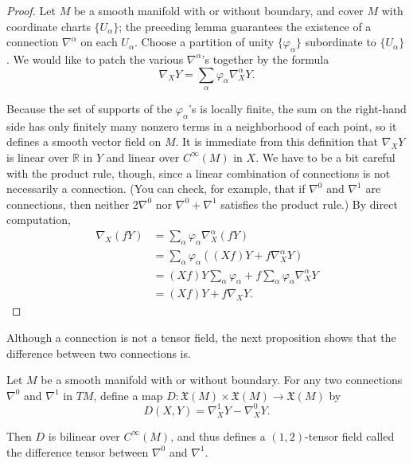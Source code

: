 \begin{proof}
Let $M$ be a smooth manifold with or without boundary, and cover $M$ with coordinate charts $\{U_\alpha\}$; the preceding lemma guarantees the existence of a connection $\nabla^\alpha$ on each $U_\alpha$. Choose a partition of unity $\{\varphi_\alpha\}$ subordinate to $\{U_\alpha\}$. We would like to patch the various $\nabla^\alpha$'s together by the formula
\begin{equation}
\nabla_X Y = \sum_\alpha \varphi_\alpha \nabla_X^\alpha Y. \tag{4.11}
\end{equation}

Because the set of supports of the $\varphi_\alpha$'s is locally finite, the sum on the right-hand side has only finitely many nonzero terms in a neighborhood of each point, so it defines a smooth vector field on $M$. It is immediate from this definition that $\nabla_X Y$ is linear over $\mathbb{R}$ in $Y$ and linear over $C^\infty(M)$ in $X$. We have to be a bit careful with the product rule, though, since a linear combination of connections is not necessarily a connection. (You can check, for example, that if $\nabla^0$ and $\nabla^1$ are connections, then neither $2\nabla^0$ nor $\nabla^0 + \nabla^1$ satisfies the product rule.) By direct computation,
\begin{align*}
\nabla_X(fY) &= \sum_\alpha \varphi_\alpha \nabla_X^\alpha(fY) \\
&= \sum_\alpha \varphi_\alpha((Xf)Y + f\nabla_X^\alpha Y) \\
&= (Xf)Y \sum_\alpha \varphi_\alpha + f\sum_\alpha \varphi_\alpha \nabla_X^\alpha Y \\
&= (Xf)Y + f\nabla_X Y.
\end{align*}
\end{proof}

Although a connection is not a tensor field, the next proposition shows that the difference between two connections is.

\begin{proposition}
\label{prop:difference-tensor}
Let $M$ be a smooth manifold with or without boundary. For any two connections $\nabla^0$ and $\nabla^1$ in $TM$, define a map $D: \mathfrak{X}(M) \times \mathfrak{X}(M) \to \mathfrak{X}(M)$ by
\[
D(X,Y) = \nabla_X^1 Y - \nabla_X^0 Y.
\]

Then $D$ is bilinear over $C^\infty(M)$, and thus defines a $(1,2)$-tensor field called the difference tensor between $\nabla^0$ and $\nabla^1$.
\end{proposition}

